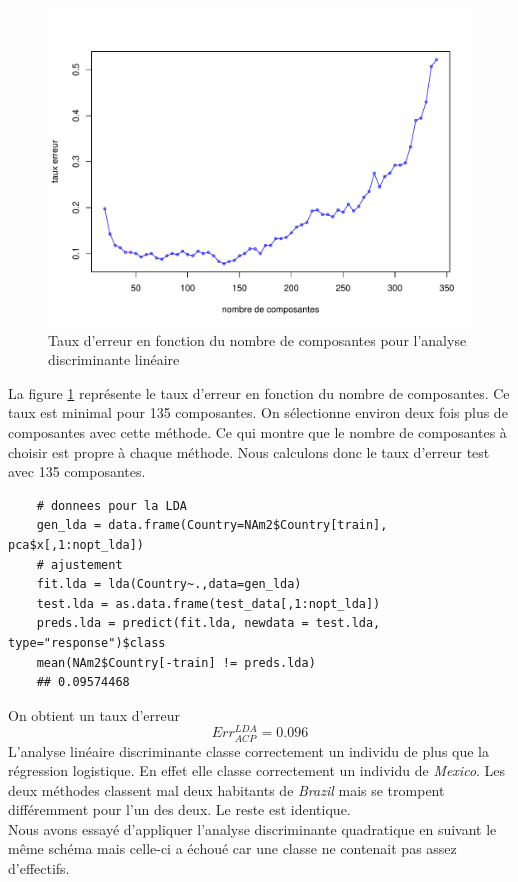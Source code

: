 \documentclass[12pt,a4paper]{article}
\begin{document}
\begin{figure}[h!]
	\begin{center}
		\includegraphics[scale=0.5]{figures/nopt_lda.pdf}
		\caption{Taux d'erreur en fonction du nombre de composantes pour l'analyse discriminante linéaire}
		\label{fig:nopt_lda}
	\end{center}
\end{figure}
La figure \ref{fig:nopt_lda} représente le taux d'erreur en fonction du nombre de composantes. Ce taux est minimal pour 135 composantes. On sélectionne environ deux fois plus de composantes avec cette méthode. Ce qui montre que le nombre de composantes à choisir est propre à chaque méthode. Nous calculons donc le taux d'erreur test avec 135 composantes.\vspace{2mm}
\begin{lstlisting}
	# donnees pour la LDA
	gen_lda = data.frame(Country=NAm2$Country[train], pca$x[,1:nopt_lda])
	# ajustement
	fit.lda = lda(Country~.,data=gen_lda)
	test.lda = as.data.frame(test_data[,1:nopt_lda])
	preds.lda = predict(fit.lda, newdata = test.lda, type="response")$class
	mean(NAm2$Country[-train] != preds.lda)
	## 0.09574468
\end{lstlisting}
On obtient un taux d'erreur \[Err_{ACP}^{LDA} = 0.096\]
L'analyse linéaire discriminante classe correctement un individu de plus que la régression logistique. En effet elle classe correctement un individu de \textit{Mexico}. Les deux méthodes classent mal deux habitants de \textit{Brazil} mais se trompent différemment pour l'un des deux. Le reste est identique. \vspace{4mm}\\
Nous avons essayé d'appliquer l'analyse discriminante quadratique en suivant le même schéma mais celle-ci a échoué car une classe ne contenait pas assez d'effectifs.
\end{document}
